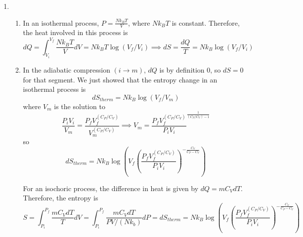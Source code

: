 \documentclass[fleqn]{article}[12pt]
\begin{document}
\begin{enumerate}
    \item \begin{enumerate}
        \item In an isothermal process, $P = \frac{Nk_BT}{V}$, where $Nk_BT$ is constant. Therefore, the heat involved in this process is
        \begin{equation*}
            dQ = \int_{V_i}^{V_f} \frac{Nk_BT}{V} dV = Nk_BT\log(V_f/V_i) \implies dS = \frac{dQ}{T} = Nk_B \log(V_f/V_i)
        \end{equation*}
        \item In the adiabatic compression $(i\to m)$, $dQ$ is by definition 0, so $dS=0$ for that segment. We just showed that the entropy change in an isothermal process is
        \begin{equation*}
            dS_{therm} = Nk_B \log(V_f/V_m)
        \end{equation*}
        where $V_m$ is the solution to
        \begin{equation*}
            \frac{P_iV_i}{V_m} = \frac{P_fV_f^{(C_P/C_V)}}{V_m^{(C_P/C_V)}} \implies V_m =
            \frac{P_f V_f^{(C_P/C_V)}}{P_i V_i}^{\frac{1}{(C_P/C_V)-1}}
        \end{equation*}
        so
        \begin{equation*}
            dS_{therm} = Nk_B \log\left(
                V_f \left(
                    \frac{P_f V_f^{(C_P/C_V)}}{P_iV_i}
                \right)^{-\frac{C_V}{C_P-C_V}}
            \right)
        \end{equation*}

        For an isochoric process, the difference in heat is given by $dQ = mC_VdT$. Therefore, the entropy is
        \begin{equation*}
            S = \int_{P_i}^{P_f} \frac{mC_VdT}{T} dV = \int_{P_i}^{P_f} \frac{mC_VdT}{PV/(Nk_b)} dP =
            dS_{therm} = Nk_B \log\left(
                V_f \left(
                    \frac{P_f V_f^{(C_P/C_V)}}{P_iV_i}
                \right)^{-\frac{C_V}{C_P-C_V}}
            \right)
        \end{equation*}
    \end{enumerate}


\end{enumerate}
\end{document}
